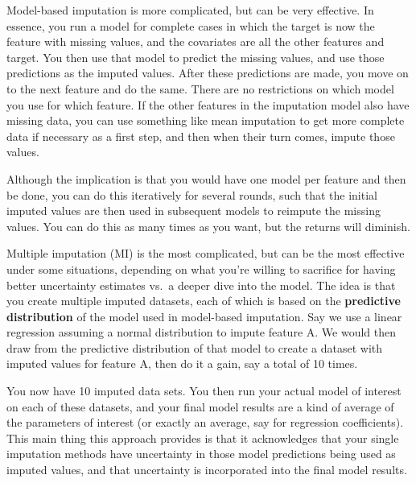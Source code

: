 \documentclass[
  letterpaper,
]{krantz}
\begin{document}
Model-based imputation is more complicated, but can be very effective.
In essence, you run a model for complete cases in which the target is
now the feature with missing values, and the covariates are all the
other features and target. You then use that model to predict the
missing values, and use those predictions as the imputed values. After
these predictions are made, you move on to the next feature and do the
same. There are no restrictions on which model you use for which
feature. If the other features in the imputation model also have missing
data, you can use something like mean imputation to get more complete
data if necessary as a first step, and then when their turn comes,
impute those values.

Although the implication is that you would have one model per feature
and then be done, you can do this iteratively for several rounds, such
that the initial imputed values are then used in subsequent models to
reimpute the missing values. You can do this as many times as you want,
but the returns will diminish.

Multiple imputation (MI) is the most complicated, but can be the most
effective under some situations, depending on what you're willing to
sacrifice for having better uncertainty estimates vs.~a deeper dive into
the model. The idea is that you create multiple imputed datasets, each
of which is based on the \textbf{predictive distribution} of the model
used in model-based imputation. Say we use a linear regression assuming
a normal distribution to impute feature A. We would then draw from the
predictive distribution of that model to create a dataset with imputed
values for feature A, then do it a gain, say a total of 10 times.

You now have 10 imputed data sets. You then run your actual model of
interest on each of these datasets, and your final model results are a
kind of average of the parameters of interest (or exactly an average,
say for regression coefficients). This main thing this approach provides
is that it acknowledges that your single imputation methods have
uncertainty in those model predictions being used as imputed values, and
that uncertainty is incorporated into the final model results.
\end{document}
